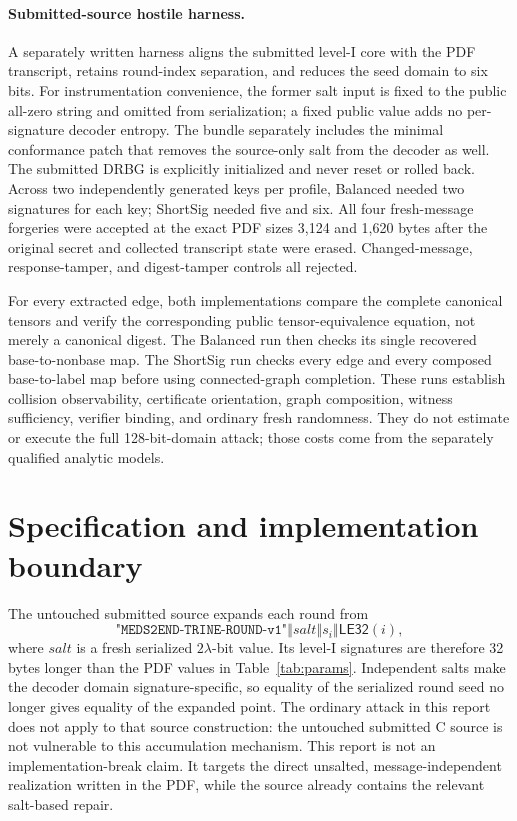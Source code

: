 \documentclass[11pt,a4paper]{article}
\begin{document}
\paragraph{Submitted-source hostile harness.}
A separately written harness aligns the submitted level-I core with the PDF
transcript, retains round-index separation, and reduces the seed domain to six
bits.  For instrumentation convenience, the former salt input is fixed to the
public all-zero string and omitted from serialization; a fixed public value
adds no per-signature decoder entropy.  The bundle separately includes the
minimal conformance patch that removes the source-only salt from the decoder
as well.  The submitted DRBG is explicitly initialized and never reset or
rolled back.  Across two independently generated keys per profile, Balanced
needed two signatures for each key; ShortSig needed five and six.  All four
fresh-message forgeries were accepted at the exact PDF sizes 3,124 and 1,620
bytes after the original secret and collected transcript state were erased.
Changed-message, response-tamper, and digest-tamper controls all rejected.

For every extracted edge, both implementations compare the complete canonical
tensors and verify the corresponding public tensor-equivalence equation, not
merely a canonical digest.  The Balanced run then checks its single recovered
base-to-nonbase map.  The ShortSig run checks every edge and every composed
base-to-label map before using connected-graph completion.  These runs
establish collision observability, certificate orientation, graph composition,
witness sufficiency, verifier binding, and ordinary fresh randomness.  They do
not estimate or execute the full 128-bit-domain attack; those costs come from
the separately qualified analytic models.

\section{Specification and implementation boundary}

The untouched submitted source expands each round from
\begin{equation}
 \texttt{"MEDS2END-TRINE-ROUND-v1"}\mathbin\Vert
 \mathit{salt}\mathbin\Vert s_i\mathbin\Vert
 \mathsf{LE32}(i),                                      \label{eq:sourcedomain}
\end{equation}
where $\mathit{salt}$ is a fresh serialized $2\lambda$-bit value.  Its level-I
signatures are therefore 32 bytes longer than the PDF values in
Table~\ref{tab:params}.  Independent salts make the decoder domain
signature-specific, so equality of the serialized round seed no longer gives
equality of the expanded point.  The ordinary attack in this report does not
apply to that source construction: the untouched submitted C source is not
vulnerable to this accumulation mechanism.  This report is not an
implementation-break claim.  It targets the direct unsalted,
message-independent realization written in the PDF, while the source already
contains the relevant salt-based repair.
\end{document}
